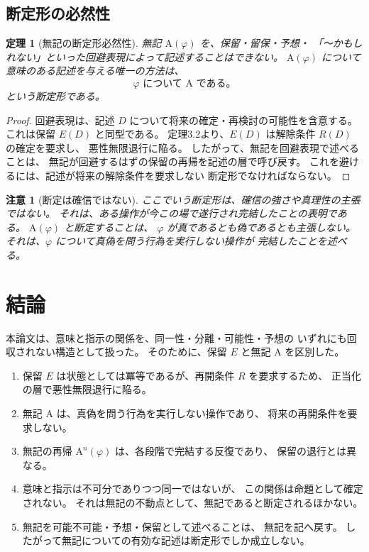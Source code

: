 \documentclass[11pt,a4paper,ja=standard,lualatex]{bxjsarticle}
\newtheorem{theorem}{定理}
\newtheorem{remark}{注意}
\begin{document}
\subsection{断定形の必然性}

\begin{theorem}[無記の断定形必然性]
無記 $\mathrm{A}(\varphi)$ を、保留・留保・予想・
「〜かもしれない」といった回避表現によって記述することはできない。
$\mathrm{A}(\varphi)$ について意味のある記述を与える唯一の方法は、
\begin{equation}
\varphi\text{ について }\mathrm{A}\text{ である。}
\end{equation}
という断定形である。
\end{theorem}

\begin{proof}
回避表現は、記述 $D$ について将来の確定・再検討の可能性を含意する。
これは保留 $E(D)$ と同型である。
定理3.2より、$E(D)$ は解除条件 $R(D)$ の確定を要求し、
悪性無限退行に陥る。
したがって、無記を回避表現で述べることは、
無記が回避するはずの保留の再帰を記述の層で呼び戻す。
これを避けるには、記述が将来の解除条件を要求しない
断定形でなければならない。
\end{proof}

\begin{remark}[断定は確信ではない]
ここでいう断定形は、確信の強さや真理性の主張ではない。
それは、ある操作が今この場で遂行され完結したことの表明である。
$\mathrm{A}(\varphi)$ と断定することは、
$\varphi$ が真であるとも偽であるとも主張しない。
それは、$\varphi$ について真偽を問う行為を実行しない操作が
完結したことを述べる。
\end{remark}

\section{結論}

本論文は、意味と指示の関係を、同一性・分離・可能性・予想の
いずれにも回収されない構造として扱った。
そのために、保留 $E$ と無記 $\mathrm{A}$ を区別した。

\begin{enumerate}
\item 保留 $E$ は状態としては冪等であるが、再開条件 $R$ を要求するため、
  正当化の層で悪性無限退行に陥る。
\item 無記 $\mathrm{A}$ は、真偽を問う行為を実行しない操作であり、
  将来の再開条件を要求しない。
\item 無記の再帰 $\mathrm{A}^{n}(\varphi)$ は、各段階で完結する反復であり、
  保留の退行とは異なる。
\item 意味と指示は不可分でありつつ同一ではないが、
  この関係は命題として確定されない。
  それは無記の不動点として、無記であると断定されるほかない。
\item 無記を可能不可能・予想・保留として述べることは、
  無記を記へ戻す。
  したがって無記についての有効な記述は断定形でしか成立しない。
\end{enumerate}
\end{document}
